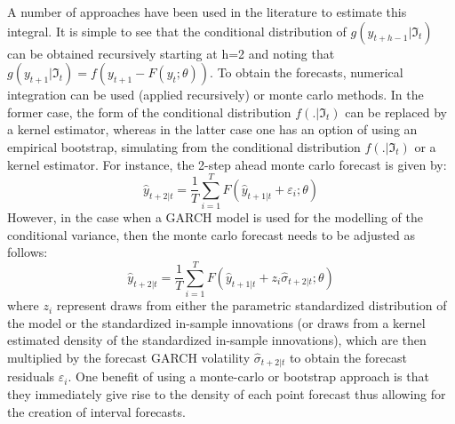 A number of approaches have been used in the literature to estimate this
integral. It is simple to see that the conditional distribution of ${g\left(
{{y_{t + h - 1}}\left| {{\Im _t}} \right.} \right)}$ can be obtained recursively
starting at h=2 and noting that $g\left( {{y_{t + 1}}\left| {{\Im _t}} \right.}
\right) = f\left( {{y_{t + 1}} - F\left( {{y_t};\theta } \right)} \right)$. To
obtain the forecasts, numerical integration can be used (applied recursively) or
monte carlo methods. In the former case, the form of the conditional
distribution $f\left( {.\left| {{\Im _t}} \right.} \right)$ can be replaced by a
kernel estimator, whereas in the latter case one has an option of using an
empirical bootstrap, simulating from the conditional distribution $f\left(
{.\left| {{\Im _t}} \right.} \right)$ or a kernel estimator. For instance,  
the 2-step ahead monte carlo forecast is given by:
\begin{equation}
{{\hat y}_{t + 2\left| t \right.}} = \frac{1}{T}\sum\limits_{i = 1}^T {F\left( {{{\hat y}_{t + 1\left| t \right.}} + {\varepsilon _i};\theta } \right)}
\end{equation}
However, in the case when a GARCH model is used for the modelling of the
conditional variance, then the monte carlo forecast needs to be adjusted as follows:
\begin{equation}
{{\hat y}_{t + 2\left| t \right.}} = \frac{1}{T}\sum\limits_{i = 1}^T {F\left( {{{\hat y}_{t + 1\left| t \right.}} + {z_i}{{\hat \sigma }_{t + 2\left| t \right.}};\theta } \right)}
\end{equation}
where $z_i$ represent draws from either the parametric standardized distribution
of the model  or the standardized in-sample innovations (or draws from a kernel
estimated density of the standardized in-sample innovations), which are then
multiplied  by the forecast GARCH volatility ${{{\hat \sigma }_{t + 2\left| t
\right.}}}$ to obtain the forecast residuals $\varepsilon_i$.
One benefit of using a monte-carlo or bootstrap approach is that they
immediately give rise to the density of each point forecast thus allowing for
the creation of interval forecasts.



